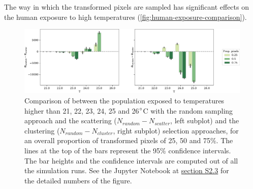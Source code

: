 \documentclass[10pt,letterpaper]{article}
\begin{document}
The way in which the transformed pixels are sampled has significant effects on the human exposure to high temperatures (\autoref{fig:human-exposure-comparison}). 
\begin{figure}[ht]
  \begin{adjustwidth}{-.4\textwidth}{0cm}  
    \centering
    \includegraphics[width=\linewidth]{figures/human-exposure-comparison}
    \caption{\label{fig:human-exposure-comparison}
      Comparison of between the population exposed to temperatures higher than 21, 22, 23, 24, 25 and 26$\degree$C with the random sampling approach and the scattering ($N_{random} - N_{scatter}$, left subplot) and the clustering ($N_{random} - N_{cluster}$, right subplot) selection approaches, for an overall proportion of transformed pixels of 25, 50 and 75\%.
      The lines at the top of the bars represent the 95\% confidence intervals. The bar heights and the confidence intervals are computed out of all the simulation runs. See the Jupyter Notebook at \hyperref[sec:si-human-exposure]{section S2.3} for the detailed numbers of the figure.}
  \end{adjustwidth}
\end{figure}
\end{document}
